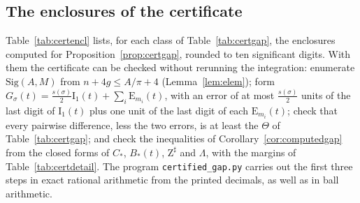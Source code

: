 \documentclass[pdflatex,sn-mathphys-num]{sn-jnl}
\theoremstyle{thmstyleone}%
\theoremstyle{thmstylethree}%
\newcommand{\Sig}{\mathrm{Sig}}
\newcommand{\cZ}{\mathrm{Z}}
\begin{document}
\begin{appendices}

\section{The enclosures of the certificate}\label{app:certificate}

Table~\ref{tab:certencl} lists, for each class of Table~\ref{tab:certgap}, the enclosures computed for Proposition~\ref{prop:certgap}, rounded to ten significant digits. With them the certificate can be checked without rerunning the integration: enumerate $\Sig(A,M)$ from $n+4g\le A/\pi+4$ (Lemma~\ref{lem:elem}); form $G_\sigma(t)=\frac{s(\sigma)}2\mathrm I_1(t)+\sum_i\mathrm E_{m_i}(t)$, with an error of at most $\frac{s(\sigma)}2$ units of the last digit of $\mathrm I_1(t)$ plus one unit of the last digit of each $\mathrm E_{m_i}(t)$; check that every pairwise difference, less the two errors, is at least the $\Theta$ of Table~\ref{tab:certgap}; and check the inequalities of Corollary~\ref{cor:computedgap} from the closed forms of $C_*$, $B_*(t)$, $\cZ^\sharp$ and $\Lambda$, with the margins of Table~\ref{tab:certdetail}. The program \texttt{certified\_gap.py} carries out the first three steps in exact rational arithmetic from the printed decimals, as well as in ball arithmetic.


\end{appendices}
\end{document}
